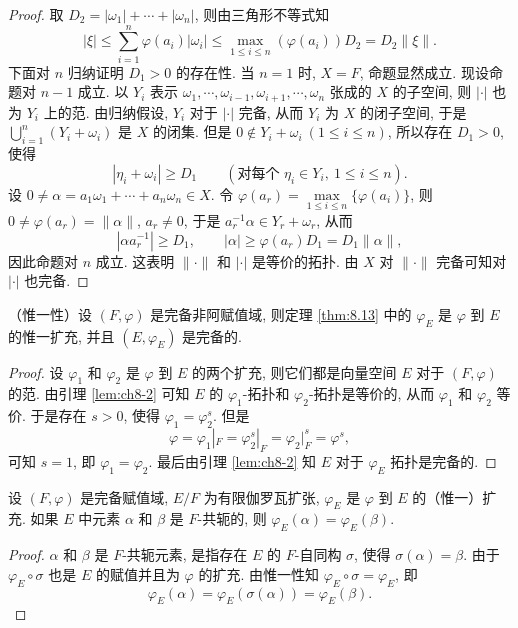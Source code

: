 \begin{proof}
取 $D_2=|\omega_1|+\cdots+|\omega_n|$, 则由三角形不等式知
\[
  |\xi|\leqslant\sum_{i=1}^{n}\varphi(a_i)|\omega_i|\leqslant\max_{1\leqslant i\leqslant n}(\varphi(a_i))D_2=D_2\|\xi\|.
\]
下面对 $n$ 归纳证明 $D_1>0$ 的存在性. 当 $n=1$ 时, $X=F$, 命题显然成立. 现设命题对 $n-1$ 成立. 以 $Y_i$ 表示 $\omega_1,\cdots,\omega_{i-1},\omega_{i+1},\cdots,\omega_n$ 张成的 $X$ 的子空间, 则 $|\cdot|$ 也为 $Y_i$ 上的范. 由归纳假设, $Y_i$ 对于 $|\cdot|$ 完备, 从而 $Y_i$ 为 $X$ 的闭子空间, 于是 $\bigcup_{i=1}^{n}(Y_i+\omega_i)$ 是 $X$ 的闭集. 但是 $0\notin Y_i+\omega_i\ (1\leqslant i\leqslant n)$, 所以存在 $D_1>0$, 使得
\[
  |\eta_i+\omega_i|\geqslant D_1\qquad(\text{对每个 } \eta_i\in Y_i,\ 1\leqslant i\leqslant n).
\]
设 $0\neq\alpha=a_1\omega_1+\cdots+a_n\omega_n\in X$. 令 $\varphi(a_r)=\max\limits_{1\leqslant i\leqslant n}\{\varphi(a_i)\}$, 则 $0\neq\varphi(a_r)=\|\alpha\|$, $a_r\neq 0$, 于是 $a_r^{-1}\alpha\in Y_r+\omega_r$, 从而
\[
  |\alpha a_r^{-1}|\geqslant D_1,\qquad|\alpha|\geqslant\varphi(a_r)D_1=D_1\|\alpha\|,
\]
因此命题对 $n$ 成立. 这表明 $\|\cdot\|$ 和 $|\cdot|$ 是等价的拓扑. 由 $X$ 对 $\|\cdot\|$ 完备可知对 $|\cdot|$ 也完备.
\end{proof}

\begin{theorem}\label{thm:8.14}
（惟一性）设 $(F,\varphi)$ 是完备非阿赋值域, 则定理 \ref{thm:8.13} 中的 $\varphi_E$ 是 $\varphi$ 到 $E$ 的惟一扩充, 并且 $(E,\varphi_E)$ 是完备的.
\end{theorem}

\begin{proof}
设 $\varphi_1$ 和 $\varphi_2$ 是 $\varphi$ 到 $E$ 的两个扩充, 则它们都是向量空间 $E$ 对于 $(F,\varphi)$ 的范. 由引理 \ref{lem:ch8-2} 可知 $E$ 的 $\varphi_1$-拓扑和 $\varphi_2$-拓扑是等价的, 从而 $\varphi_1$ 和 $\varphi_2$ 等价. 于是存在 $s>0$, 使得 $\varphi_1=\varphi_2^s$. 但是
\[
  \varphi=\varphi_1|_F=\varphi_2^s|_F=\varphi_2|_F^s=\varphi^s,
\]
可知 $s=1$, 即 $\varphi_1=\varphi_2$. 最后由引理 \ref{lem:ch8-2} 知 $E$ 对于 $\varphi_E$ 拓扑是完备的.
\end{proof}

\begin{theorem}\label{thm:8.15}
设 $(F,\varphi)$ 是完备赋值域, $E/F$ 为有限伽罗瓦扩张, $\varphi_E$ 是 $\varphi$ 到 $E$ 的（惟一）扩充. 如果 $E$ 中元素 $\alpha$ 和 $\beta$ 是 $F$-共轭的, 则 $\varphi_E(\alpha)=\varphi_E(\beta)$.
\end{theorem}

\begin{proof}
$\alpha$ 和 $\beta$ 是 $F$-共轭元素, 是指存在 $E$ 的 $F$-自同构 $\sigma$, 使得 $\sigma(\alpha)=\beta$. 由于 $\varphi_E\circ\sigma$ 也是 $E$ 的赋值并且为 $\varphi$ 的扩充. 由惟一性知 $\varphi_E\circ\sigma=\varphi_E$, 即
\[
  \varphi_E(\alpha)=\varphi_E(\sigma(\alpha))=\varphi_E(\beta).
\]
\end{proof}

